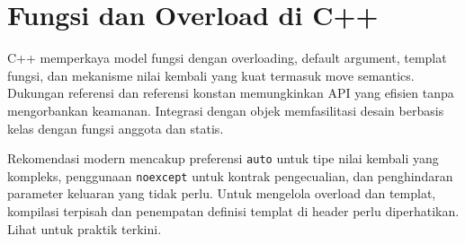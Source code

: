 \documentclass[../main.tex]{subfiles}
\begin{document}
\section{Fungsi dan Overload di C++}
C++ memperkaya model fungsi dengan overloading, default argument, templat fungsi, dan mekanisme nilai kembali yang kuat termasuk move semantics. Dukungan referensi dan referensi konstan memungkinkan API yang efisien tanpa mengorbankan keamanan. Integrasi dengan objek memfasilitasi desain berbasis kelas dengan fungsi anggota dan statis.

Rekomendasi modern mencakup preferensi \texttt{auto} untuk tipe nilai kembali yang kompleks, penggunaan \texttt{noexcept} untuk kontrak pengecualian, dan penghindaran parameter keluaran yang tidak perlu. Untuk mengelola overload dan templat, kompilasi terpisah dan penempatan definisi templat di header perlu diperhatikan. Lihat \textcite{cpp-functions,cpp-reference} untuk praktik terkini.
\end{document}
